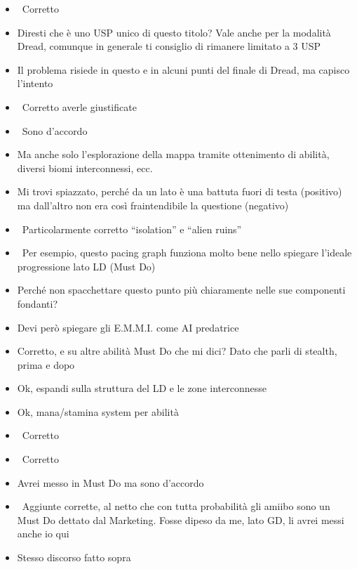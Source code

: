 {\begin{itemize}
  \item {} \rvBene\ Corretto
  \item {} Diresti che è uno USP unico di questo titolo? Vale anche per la modalità Dread, comunque in generale ti consiglio di rimanere limitato a 3 USP
  \item {} Il problema risiede in questo e in alcuni punti del finale di Dread, ma capisco l'intento
  \item {} \rvBene\ Corretto averle giustificate
  \item {} \rvBene\ Sono d'accordo
  \item {} Ma anche solo l'esplorazione della mappa tramite ottenimento di abilità, diversi biomi interconnessi, ecc.
  \item {} Mi trovi spiazzato, perché da un lato è una battuta fuori di testa (positivo) ma dall'altro non era così fraintendibile la questione (negativo)
  \item {} \rvBene\ Particolarmente corretto ``isolation'' e ``alien ruins''
  \item {} \rvBene\ Per esempio, questo pacing graph funziona molto bene nello spiegare l'ideale progressione lato LD (Must Do)
  \item {} Perché non spacchettare questo punto più chiaramente nelle sue componenti fondanti?
  \item {} Devi però spiegare gli E.M.M.I. come AI predatrice
  \item {} Corretto, e su altre abilità Must Do che mi dici? Dato che parli di stealth, prima e dopo
  \item {} Ok, espandi sulla struttura del LD e le zone interconnesse
  \item {} Ok, mana/stamina system per abilità
  \item {} \rvBene\ Corretto
  \item {} \rvBene\ Corretto
  \item {} Avrei messo in Must Do ma sono d'accordo
  \item {} \rvBene\ Aggiunte corrette, al netto che con tutta probabilità gli amiibo sono un Must Do dettato dal Marketing. Fosse dipeso da me, lato GD, li avrei messi anche io qui
  \item {} Stesso discorso fatto sopra
\end{itemize}
}


